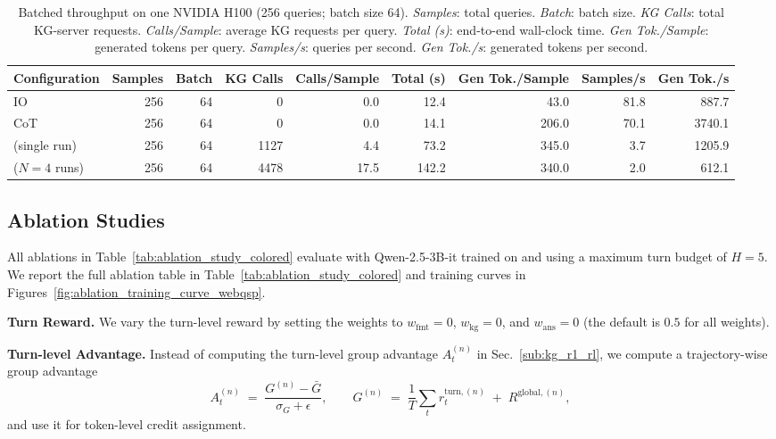 \begin{table}[ht]
\centering
\caption{Batched throughput on one NVIDIA H100 (256 queries; batch size 64).
\emph{Samples}: total queries. \emph{Batch}: batch size. \emph{KG Calls}: total KG-server requests.
\emph{Calls/Sample}: average KG requests per query. \emph{Total (s)}: end-to-end wall-clock time.
\emph{Gen Tok./Sample}: generated tokens per query. \emph{Samples/s}: queries per second.
\emph{Gen Tok./s}: generated tokens per second.}
\label{tab:batched_throughput}
\small
\setlength{\tabcolsep}{4pt}
\begin{adjustbox}{width=0.9\linewidth}
\begin{tabular}{@{}l|r|r|r|r|r|r|r|r@{}}
\toprule
\textbf{Configuration} & \textbf{Samples} & \textbf{Batch} & \textbf{KG Calls} & \textbf{Calls/Sample} & \textbf{Total (s)} & \textbf{Gen Tok./Sample} & \textbf{Samples/s} & \textbf{Gen Tok./s} \\
\midrule
IO              & 256 & 64 & 0    & 0.0  & 12.4  & 43.0  & 81.8 & 887.7 \\
CoT                   & 256 & 64 & 0    & 0.0  & 14.1  & 206.0 & 70.1 & 3740.1 \\
\framework{} (single run)   & 256 & 64 & 1127 & 4.4  & 73.2  & 345.0 & 3.7  & 1205.9 \\
\framework{} ($N{=}4$ runs) & 256 & 64 & 4478 & 17.5 & 142.2 & 340.0 & 2.0  & 612.1 \\
\bottomrule
\end{tabular}
\end{adjustbox}
\end{table}




\subsection{Ablation Studies}
\label{appendix:ablations}
All ablations in Table~\ref{tab:ablation_study_colored} evaluate \framework{} with Qwen-2.5-3B-it trained on  and  using a maximum turn budget of \(H{=}5\).
We report the full ablation table in Table~\ref{tab:ablation_study_colored} and training curves in Figures~\ref{fig:ablation_training_curve_webqsp}.

\noindent \textbf{Turn Reward.} We vary the turn-level reward by setting the weights to \(w_{\text{fmt}}{=}0\), \(w_{\text{kg}}{=}0\), and \(w_{\text{ans}}{=}0\) (the default is \(0.5\) for all weights).

\noindent \textbf{Turn-level Advantage.} Instead of computing the turn-level group advantage \(A_t^{(n)}\) in Sec.~\ref{sub:kg_r1_rl}, we compute a trajectory-wise group advantage
\[
A_t^{(n)} \;=\; \frac{G^{(n)}-\bar{G}}{\sigma_{G}+\epsilon},\qquad
G^{(n)} \;=\; \frac{1}{T}\sum_{t} r_{t}^{\text{turn},(n)} \;+\; R^{\text{global},(n)},
\]
and use it for token-level credit assignment.

